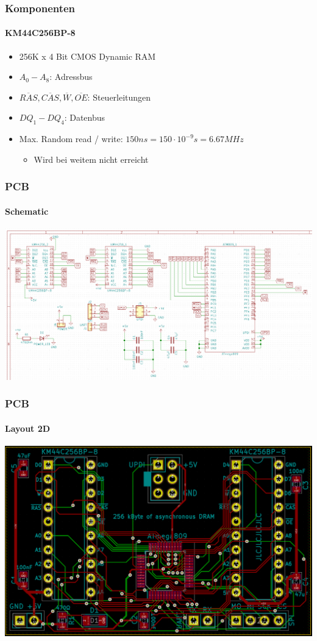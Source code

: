 \documentclass{beamer}
\begin{document}
\begin{frame}

	\frametitle{Komponenten}
	\framesubtitle{KM44C256BP-8}
	\begin{itemize}
		\item 256K x 4 Bit CMOS Dynamic RAM
		\item $A_0 - A_8$: Adressbus
		\item $\overline{RAS}, \overline{CAS}, \overline{W}, \overline{OE}$: Steuerleitungen
		\item $DQ_1 - DQ_4$: Datenbus
		\item Max. Random read / write: $150ns = 150\cdot 10^{-9}s = 6.67MHz$
		\begin{itemize}
			\item Wird bei weitem nicht erreicht
		\end{itemize}
	\end{itemize}
	
\end{frame}

\begin{frame}

	\frametitle{PCB}
	\framesubtitle{Schematic}
	\begin{center}
		\includegraphics[scale=0.243]{images/KiCAD_Schematic_View.png}
	\end{center}

\end{frame}

\begin{frame}

	\frametitle{PCB}
	\framesubtitle{Layout 2D}
	\begin{center}
		\includegraphics[scale=0.15]{images/KiCAD_2D_PCB_View.png}
	\end{center}
	
\end{frame}
\end{document}

